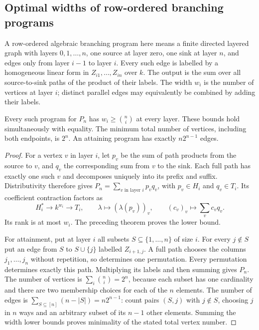 \subsection{Optimal widths of row-ordered branching programs}

A row-ordered algebraic branching program here means a finite directed
layered graph with layers $0,1,\ldots,n$, one source at layer zero,
one sink at layer $n$, and edges only from layer $i-1$ to layer $i$.
Every such edge is labelled by a homogeneous linear form in
$Z_{i1},\ldots,Z_{in}$ over $k$. The output is the sum over all
source-to-sink paths of the product of their labels. The width $w_i$
is the number of vertices at layer $i$; distinct parallel edges may
equivalently be combined by adding their labels.

\begin{theorem}\label{thm:per-row-abp}
Every such program for $P_n$ has $w_i\ge\binom ni$ at every layer.
These bounds hold simultaneously with equality. The minimum total
number of vertices, including both endpoints, is $2^n$.
An attaining program has exactly $n2^{n-1}$ edges.
\end{theorem}
\begin{proof}
For a vertex $v$ in layer $i$, let $p_v$ be the sum of path products
from the source to $v$, and $q_v$ the corresponding sum from $v$
to the sink. Each full path has exactly one such $v$ and decomposes
uniquely into its prefix and suffix. Distributivity therefore gives
$P_n=\sum_{v\text{ in layer }i}p_vq_v$, with $p_v\in H_i$ and
$q_v\in T_i$. Its coefficient contraction factors as
\[
 H_i^*\longrightarrow k^{w_i}\longrightarrow T_i,
 \qquad\lambda\longmapsto(\lambda(p_v))_v,
 \qquad(c_v)_v\longmapsto\sum_v c_vq_v.
\]
Its rank is at most $w_i$. The preceding theorem proves the lower bound.

For attainment, put at layer $i$ all subsets $S\subseteq\{1,\ldots,n\}$
of size $i$. For every $j\notin S$ put an edge from $S$ to
$S\cup\{j\}$ labelled $Z_{i+1,j}$. A full path chooses the columns
$j_1,\ldots,j_n$ without repetition, so determines one permutation.
Every permutation determines exactly this path. Multiplying its
labels and then summing gives $P_n$. The number of vertices is
$\sum_i\binom ni=2^n$, because each subset has one cardinality and
there are two membership choices for each of the $n$ elements.
The number of edges is
$\sum_{S\subseteq[n]}(n-|S|)=n2^{n-1}$: count pairs $(S,j)$ with
$j\notin S$, choosing $j$ in $n$ ways and an arbitrary subset of
its $n-1$ other elements. Summing the width lower bounds proves
minimality of the stated total vertex number.
\end{proof}

